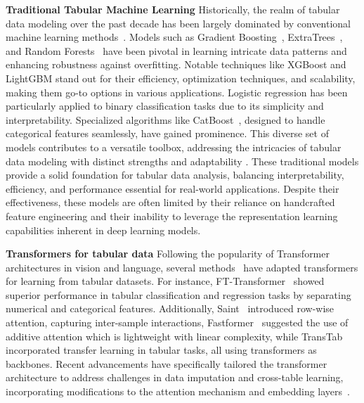 \noindent \textbf{Traditional Tabular Machine Learning} 
Historically, the realm of tabular data modeling over the past decade has been largely dominated by conventional machine learning methods~\cite{shwartz2022tabular}. 
Models such as Gradient Boosting~\cite{bentejac2021comparative}, ExtraTrees~\cite{geurts2006extremely}, and Random Forests~\cite{breiman2001random} have been pivotal in learning intricate data patterns and enhancing robustness against overfitting. 
Notable techniques like XGBoost \cite{chen2016xgboost} and LightGBM \cite{ke2017lightgbm} stand out for their efficiency, optimization techniques, and scalability, making them go-to options in various applications. 
Logistic regression \cite{hosmer2013applied} has been particularly applied to binary classification tasks due to its simplicity and interpretability.
Specialized algorithms like CatBoost~\cite{prokhorenkova2018catboost}, designed to handle categorical features seamlessly, have gained prominence. 
This diverse set of models contributes to a versatile toolbox, addressing the intricacies of tabular data modeling with distinct strengths and adaptability \cite{grinsztajn2022tree}. These traditional models provide a solid foundation for tabular data analysis, balancing interpretability, efficiency, and performance essential for real-world applications.
Despite their effectiveness, these models are often limited by their reliance on handcrafted feature engineering and their inability to leverage the representation learning capabilities inherent in deep learning models.



\noindent \textbf{Transformers for tabular data} 
Following the popularity of Transformer architectures in vision and language, several methods~\cite{hollmann2022tabpfn, arik2021tabnet, zhu2023xtab} have adapted transformers for learning from tabular datasets. 
For instance, FT-Transformer~\cite{gorishniy2021revisiting} showed superior performance in tabular classification and regression tasks by separating numerical and categorical features. 
Additionally, Saint~\cite{somepalli2021saint} introduced row-wise attention, capturing inter-sample interactions, Fastformer~\cite{wu2021fastformer} suggested the use of additive attention which is lightweight with linear complexity, while TransTab~\cite{wang2022transtab} incorporated transfer learning in tabular tasks, all using transformers as backbones. Recent advancements have specifically tailored the transformer architecture to address challenges in data imputation and cross-table learning, incorporating modifications to the attention mechanism and embedding layers~\cite{badaro2023transformers}.

